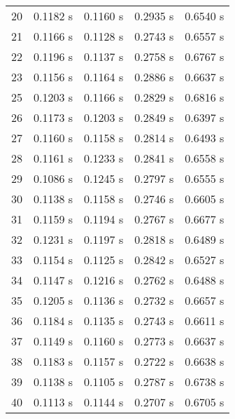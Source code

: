 \begin{table}[]
\begin{tabular}{cllll}
    20 &0.1182 s & 0.1160 s & 0.2935 s & 0.6540 s \\
    21 & 0.1166 s & 0.1128 s  & 0.2743 s & 0.6557 s \\
    22 & 0.1196 s  & 0.1137 s & 0.2758 s & 0.6767 s \\
    23 & 0.1156 s & 0.1164 s & 0.2886 s & 0.6637 s \\
    25 & 0.1203 s & 0.1166 s & 0.2829 s & 0.6816 s \\
    26 & 0.1173 s & 0.1203 s & 0.2849 s & 0.6397 s \\
    27 & 0.1160 s  & 0.1158 s & 0.2814 s & 0.6493 s \\
    28 & 0.1161 s & 0.1233 s & 0.2841 s & 0.6558 s \\
    29 & 0.1086 s & 0.1245 s & 0.2797 s & 0.6555 s \\
    30 &0.1138 s & 0.1158 s & 0.2746 s & 0.6605 s \\
    31 &0.1159 s & 0.1194 s   & 0.2767 s & 0.6677 s \\
    32 &0.1231 s  & 0.1197 s & 0.2818 s & 0.6489 s \\
    33 &0.1154 s & 0.1125 s & 0.2842 s & 0.6527 s  \\
    34 &0.1147 s  & 0.1216 s & 0.2762 s & 0.6488 s \\
    35 &0.1205 s & 0.1136 s & 0.2732 s & 0.6657 s \\
    36 &0.1184 s & 0.1135 s & 0.2743 s & 0.6611 s \\
    37 &0.1149 s  & 0.1160 s & 0.2773 s & 0.6637 s \\
    38 &0.1183 s & 0.1157 s & 0.2722 s & 0.6638 s \\
    39 &0.1138 s & 0.1105 s & 0.2787 s & 0.6738 s  \\
    40 &0.1113 s & 0.1144 s & 0.2707 s & 0.6705 s
  \end{tabular}
\end{table}

